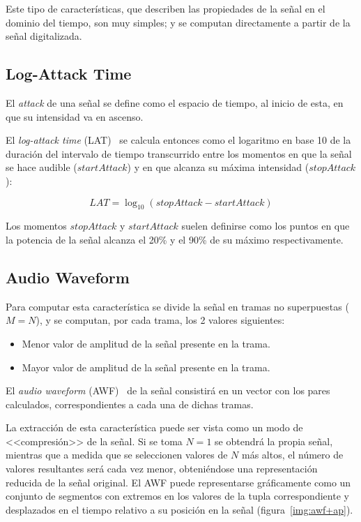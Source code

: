 Este tipo de características, que describen las propiedades de la señal en el dominio del tiempo, son muy simples;
y se computan directamente a partir de la señal digitalizada.

\subsection{Log-Attack Time}\label{subsec:log-attackTime}

El \textit{attack} de una señal se define como el espacio de tiempo, al inicio de esta, en que su intensidad va en ascenso.

El \textit{log-attack time} (LAT)~\cite{Gunasekaran11,Kim05,Manjunath02,Peters04} se calcula entonces como el logaritmo en base 10 de la duración del intervalo de tiempo transcurrido entre los momentos en que la señal se hace audible ($startAttack$) y en que alcanza su máxima intensidad ($stopAttack$):

\begin{equation}
    \label{eq:LAT}
    LAT = \log_{10}{(stopAttack - startAttack)}
\end{equation}

Los momentos $stopAttack$ y $startAttack$ suelen definirse como los puntos en que la potencia de la señal alcanza el 20\% y el 90\% de su máximo respectivamente.

\subsection{Audio Waveform}\label{subsec:audioWaveform}

Para computar esta característica se divide la señal en tramas no superpuestas ($M = N$), y se computan, por cada trama, los 2 valores siguientes:

\begin{itemize}
    \item Menor valor de amplitud de la señal presente en la trama.
    \item Mayor valor de amplitud de la señal presente en la trama.
\end{itemize}

El \textit{audio waveform} (AWF)~\cite{Kim05,Manjunath02} de la señal consistirá en un vector con los pares calculados, correspondientes a cada una de dichas tramas.

La extracción de esta característica puede ser vista como un modo de <<compresión>> de la señal.
Si se toma $N=1$ se obtendrá la propia señal, mientras que a medida que se seleccionen valores de $N$ más altos, el número de valores resultantes será cada vez menor, obteniéndose una representación reducida de la señal original.
El AWF puede representarse gráficamente como un conjunto de segmentos con extremos en los valores de la tupla correspondiente y desplazados en el tiempo relativo a su posición en la señal (figura~\ref{img:awf+ap}).

